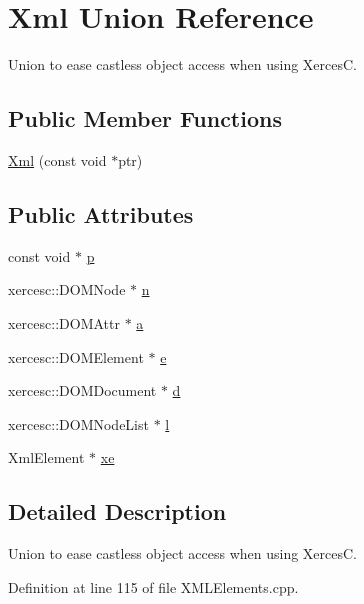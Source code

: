 \hypertarget{union_xml}{}\section{Xml Union Reference}
\label{union_xml}


Union to ease castless object access when using XercesC.  


\subsection*{Public Member Functions}
\begin{DoxyCompactItemize}
\item 
\hyperlink{union_xml_a96480dcc1523d3be6c9b93187f336ac0}{Xml} (const void $\ast$ptr)
\end{DoxyCompactItemize}
\subsection*{Public Attributes}
\begin{DoxyCompactItemize}
\item 
const void $\ast$ \hyperlink{union_xml_a1049a06460eb8ee2878b7ced0fdb19e8}{p}
\item 
xercesc\+::\+D\+O\+M\+Node $\ast$ \hyperlink{union_xml_a6b78aa150fc8fa96aa1ce57c01a5268d}{n}
\item 
xercesc\+::\+D\+O\+M\+Attr $\ast$ \hyperlink{union_xml_a5a994b5f4b681d2f041c7c1261565c4e}{a}
\item 
xercesc\+::\+D\+O\+M\+Element $\ast$ \hyperlink{union_xml_a6d7cc65c82929e86d2f8e2b300a10624}{e}
\item 
xercesc\+::\+D\+O\+M\+Document $\ast$ \hyperlink{union_xml_a3f663e54c774ae9eb843e0c8b0abd337}{d}
\item 
xercesc\+::\+D\+O\+M\+Node\+List $\ast$ \hyperlink{union_xml_ac527c7a9b99fd1748b7a33e401b7f003}{l}
\item 
Xml\+Element $\ast$ \hyperlink{union_xml_abd997a186caa27d85c309989aceb690f}{xe}
\end{DoxyCompactItemize}


\subsection{Detailed Description}
Union to ease castless object access when using XercesC. 

Definition at line 115 of file X\+M\+L\+Elements.\+cpp.



